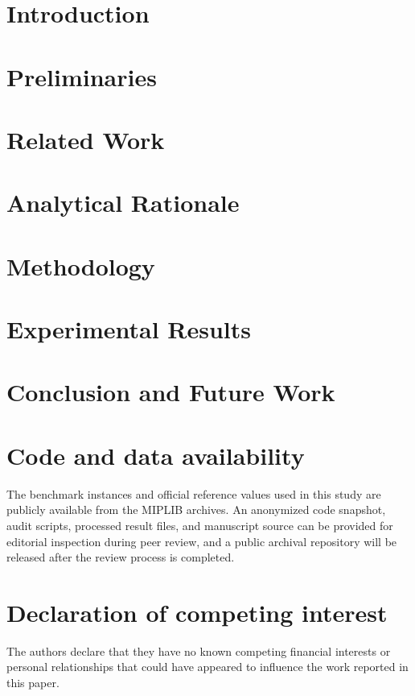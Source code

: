 \documentclass[preprint,12pt]{elsarticle}
\begin{document}
\section{Introduction}
\label{sec:introduction}


\section{Preliminaries}
\label{sec:preliminaries}


\section{Related Work}
\label{sec:related_work}


\section{Analytical Rationale}
\label{sec:theory}


\section{Methodology}
\label{sec:methodology}


\section{Experimental Results}
\label{sec:experiments}


\section{Conclusion and Future Work}
\label{sec:conclusion}


\section*{Code and data availability}
The benchmark instances and official reference values used in this study are publicly available from the MIPLIB archives. An anonymized code snapshot, audit scripts, processed result files, and manuscript source can be provided for editorial inspection during peer review, and a public archival repository will be released after the review process is completed.

\section*{Declaration of competing interest}
The authors declare that they have no known competing financial interests or personal relationships that could have appeared to influence the work reported in this paper.
\end{document}
